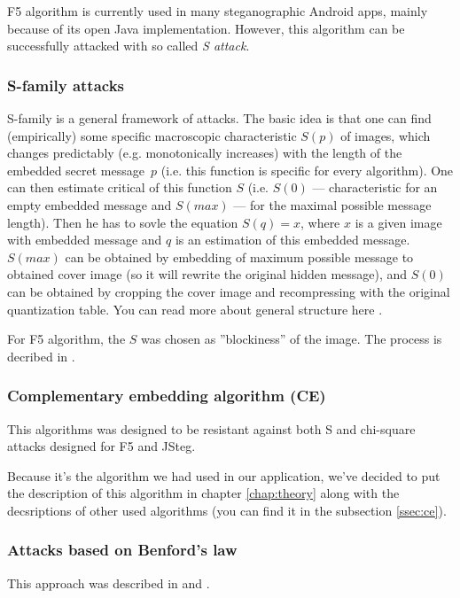 F5 algorithm is currently used in many steganographic Android apps, mainly because of its open Java implementation. However, this
algorithm can be successfully attacked with so called \emph{S attack}.


\subsubsection{S-family attacks}

S-family is a general framework of attacks. The basic idea is that one can find (empirically) some specific macroscopic 
characteristic $S(p)$ of images, which changes predictably (e.g. monotonically increases) 
with the length of the embedded secret message~$p$ (i.e. this function is specific for every algorithm). 
One can then estimate critical of this function $S$ (i.e. $S(0)$ --- characteristic for an empty embedded message and
$S(max)$ --- for the maximal possible message length). Then he has to sovle the equation $S(q) = x$, where $x$ is a given
image with embedded message and $q$ is an estimation of this embedded message. $S(max)$ can be obtained by embedding of
maximum possible message to obtained cover image (so it will rewrite the original hidden message), and $S(0)$ can be obtained
by cropping the cover image and recompressing with the original quantization table. You can read more about general structure
here \cite{fridrich2002attacking}.

For F5 algorithm, the $S$ was chosen as ''blockiness'' of the image. The process is decribed in \cite{fridrich2002steganalysis}.

\subsubsection{Complementary embedding algorithm (CE)}

This algorithms was designed to be resistant against both S and chi-square attacks designed for F5 and JSteg.

Because it's the algorithm we had used in our application, 
we've decided to put the description of this algorithm in chapter \ref{chap:theory}
along with the decsriptions of other used algorithms (you can find it in the subsection
\ref{ssec:ce}).

\subsubsection{Attacks based on Benford's law}

This approach was described in \cite{andriotis2013two} and \cite{andriotis2013jpeg}.

